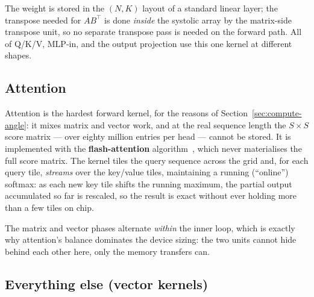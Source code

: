 \documentclass[11pt]{report}
\begin{document}
\noindent The weight is stored in the $(N,K)$ layout of a standard linear
layer; the transpose needed for $A B^\top$ is done \emph{inside} the
systolic array by the matrix-side transpose unit, so no separate transpose
pass is needed on the forward path. All of Q/K/V, MLP-in, and the output
projection use this one kernel at different shapes.

\subsection{Attention}

Attention is the hardest forward kernel, for the reasons of
Section~\ref{sec:compute-angle}: it mixes matrix and vector work, and at the
real sequence length the $S\times S$ score matrix --- over eighty million
entries per head --- cannot be stored. It is implemented with the
\textbf{flash-attention} algorithm~\cite{dao2022flashattention}, which never
materialises the full score matrix. The kernel tiles the query sequence
across the grid and, for each query tile, \emph{streams} over the key/value
tiles, maintaining a running (``online'') softmax: as each new key tile
shifts the running maximum, the partial output accumulated so far is
rescaled, so the result is exact without ever holding more than a few tiles
on chip.

\begin{algorithm}[H]
\DontPrintSemicolon
{}
\caption{Flash attention, forward (online softmax, tiled stream)}
\end{algorithm}

\noindent The matrix and vector phases alternate \emph{within} the
inner loop, which is exactly why attention's balance dominates the device
sizing: the two units cannot hide behind each other here, only the memory
transfers can.

\subsection{Everything else (vector kernels)}
\end{document}
